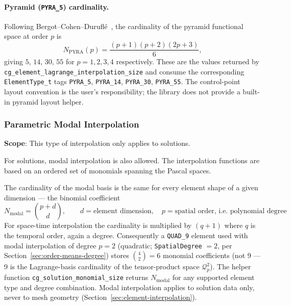 \documentclass[11pt,letterpaper]{article}
\newenvironment{v2quote}
  {\begin{v2quoteframe}%
   \noindent{\footnotesize\sffamily\bfseries\color{cgnsblue}v2 text}%
   \nopagebreak\par\nopagebreak\vspace{0.15em}}
  {\end{v2quoteframe}}
\newcommand{\Qtp}{\mathcal{Q}^{2}_p}
\begin{document}
\paragraph{Pyramid (\texttt{PYRA\_5}) cardinality.}
Following Bergot--Cohen--Durufl\'e~\cite{BCD10}, the cardinality of the pyramid functional space
at order $p$ is
\begin{equation}
  N_\mathrm{PYRA}(p) = \frac{(p+1)(p+2)(2p+3)}{6},
\end{equation}
giving $5$, $14$, $30$, $55$ for $p=1,2,3,4$ respectively.  These are the values returned by
\texttt{cg\_element\_lagrange\_interpolation\_size} and consume the corresponding
\texttt{ElementType\_t} tags \texttt{PYRA\_5}, \texttt{PYRA\_14}, \texttt{PYRA\_30},
\texttt{PYRA\_55}.  The control-point layout convention is the user's responsibility; the
library does not provide a built-in pyramid layout helper.

\subsubsection{Parametric Modal Interpolation}
\label{sec:parametric-modal}

\begin{v2quote}
\textbf{Scope}: This type of interpolation only applies to solutions.
\end{v2quote}

\begin{v2quote}
For solutions, modal interpolation is also allowed.  The interpolation functions are based on an
ordered set of monomials spanning the Pascal spaces.
\end{v2quote}

The cardinality of the modal basis is the
same for every element shape of a given dimension --- the binomial coefficient
\begin{equation}
  N_\mathrm{modal} = \binom{p+d}{d}, \qquad d = \text{element dimension}, \quad
  p = \text{spatial order, i.e.\ polynomial degree}
\end{equation}
For space-time interpolation the cardinality is multiplied by $(q+1)$ where $q$ is the temporal
order, again a degree.  Consequently a \texttt{QUAD\_9} element used with modal interpolation of
degree $p=2$ (quadratic; \texttt{SpatialDegree} $=2$, per
Section~\ref{sec:order-means-degree}) stores
$\binom{4}{2} = 6$ monomial coefficients (not 9 --- 9 is the Lagrange-basis cardinality of the
tensor-product space $\Qtp$).  The helper function \texttt{cg\_solution\_monomial\_size} returns
$N_\mathrm{modal}$ for any supported element type and degree combination.  Modal interpolation
applies to solution data only, never to mesh geometry
(Section~\ref{sec:element-interpolation}).
\end{document}
